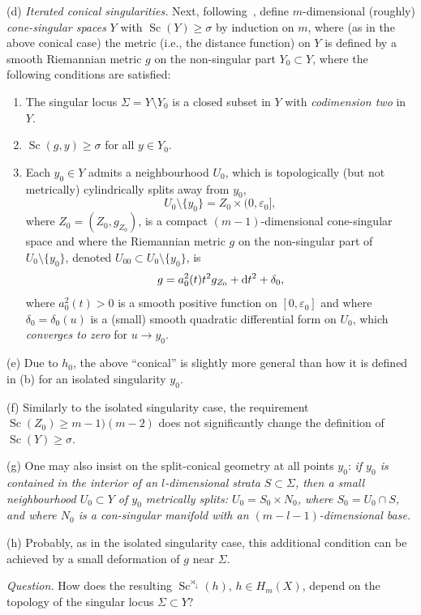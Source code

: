 \documentclass[10pt,a4paper]{amsart}
\numberwithin{equation}{section}
\begin{document}
(d) {\it Iterated conical singularities.} Next, following~\cite{Ch1979}, define $m$-dimensional (roughly) {\it cone-singular spaces} $Y$ with $\operatorname{Sc}(Y)\geq \sigma$ by induction on $m$, where (as in the above conical case) the metric (i.e., the distance function) on $Y$ is defined
by a smooth Riemannian metric $g$ on the non-singular part $Y_0\subset Y$, where the following conditions are satisfied:
\begin{enumerate}\itemsep=0pt
\item[(i)] The singular locus $\Sigma=Y\setminus Y_0$ is a closed subset in $Y$ with {\it codimension two} in $Y$.
\item[(ii)] $\operatorname{Sc}(g, y)\geq \sigma$ for all $y\in Y_0$.
\item[(iii)] Each $y_0\in Y$ admits a neighbourhood $U_0$, which is topologically (but not metrically) cylindrically splits away from $y_0$,
\[
U_0\setminus\{y_0\}=Z_0\times (0,\varepsilon_0],
\]
 where $Z_0=(Z_0, g_{Z_0})$, is a compact $(m-1)$-dimensional cone-singular space and where the Riemannian metric $g$ on the non-singular part
 of $U_0\setminus \{y_0\}$, denoted $U_{00} \subset U_0\setminus \{y_0\}$, is
\[
g= a_0^2(t)t^2g_{Z_0} +{\rm d}t^2+\delta_0,
\]
where $a_0^2(t)>0$ is a smooth positive function on $[0, \varepsilon_0]$ and where $\delta_0=\delta_0(u)$
 is a (small) smooth quadratic differential form on $U_0$, which {\it converges to zero} for $u\to y_0$.
\end{enumerate}

(e) Due to $h_0$, the above ``conical'' is slightly more general than how it is defined in (b) for an isolated singularity $y_0$.

(f) Similarly to the isolated singularity case, the requirement $\operatorname{Sc}(Z_0)\geq m-1)(m-2)$ does not significantly change the definition of $\operatorname{Sc}(Y)\geq \sigma$.

(g) One may also insist on the split-conical geometry at all points $y_0$:
{\it if $y_0$ is contained in the interior of an $l$-dimensional strata $S\subset \Sigma$, then
 a small neighbourhood $U_0\subset Y $ of $y_0$ metrically splits:
$U_0=S_0\times N_0$, where $S_0=U_0\cap S$, and where $N_0$ is a con-singular manifold with an $(m-l-1)$-dimensional base.}

(h) Probably, as in the isolated singularity case, this additional condition can be achieved by a small deformation of $g$ near $\Sigma$.

{\it Question.} How does the resulting
$\operatorname{Sc}^{\rtimes_\downarrow}(h)$, $h\in H_m(X)$, depend on the topology of the singular locus $\Sigma \subset Y$?
\end{document}
